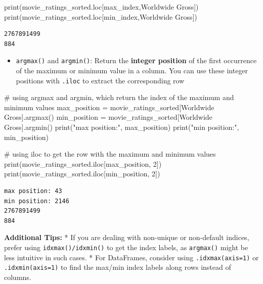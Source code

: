 \documentclass[
  letterpaper,
  DIV=11,
  numbers=noendperiod]{scrreprt}
\newenvironment{Shaded}{\begin{snugshade}}{\end{snugshade}}
\newcommand{\BuiltInTok}[1]{\textcolor[rgb]{0.00,0.23,0.31}{#1}}
\newcommand{\CommentTok}[1]{\textcolor[rgb]{0.37,0.37,0.37}{#1}}
\newcommand{\DecValTok}[1]{\textcolor[rgb]{0.68,0.00,0.00}{#1}}
\newcommand{\NormalTok}[1]{\textcolor[rgb]{0.00,0.23,0.31}{#1}}
\newcommand{\OperatorTok}[1]{\textcolor[rgb]{0.37,0.37,0.37}{#1}}
\newcommand{\StringTok}[1]{\textcolor[rgb]{0.13,0.47,0.30}{#1}}
\providecommand{\tightlist}{%
  \setlength{\itemsep}{0pt}\setlength{\parskip}{0pt}}\usepackage{longtable,booktabs,array}
\begin{document}
\begin{Shaded}
\begin{Highlighting}[]
\BuiltInTok{print}\NormalTok{(movie\_ratings\_sorted.loc[max\_index,}\StringTok{\textquotesingle{}Worldwide Gross\textquotesingle{}}\NormalTok{])}
\BuiltInTok{print}\NormalTok{(movie\_ratings\_sorted.loc[min\_index,}\StringTok{\textquotesingle{}Worldwide Gross\textquotesingle{}}\NormalTok{])}
\end{Highlighting}
\end{Shaded}

\begin{verbatim}
2767891499
884
\end{verbatim}

\begin{itemize}
\tightlist
\item
  \texttt{argmax()} and \texttt{argmin()}: Return the \textbf{integer
  position} of the first occurrence of the maximum or minimum value in a
  column. You can use these integer positions with \texttt{.iloc} to
  extract the corresponding row
\end{itemize}

\begin{Shaded}
\begin{Highlighting}[]
\CommentTok{\# using argmax and argmin, which return the index of the maximum and minimum values}
\NormalTok{max\_position }\OperatorTok{=}\NormalTok{ movie\_ratings\_sorted[}\StringTok{\textquotesingle{}Worldwide Gross\textquotesingle{}}\NormalTok{].argmax()}
\NormalTok{min\_position }\OperatorTok{=}\NormalTok{ movie\_ratings\_sorted[}\StringTok{\textquotesingle{}Worldwide Gross\textquotesingle{}}\NormalTok{].argmin()}
\BuiltInTok{print}\NormalTok{(}\StringTok{"max position:"}\NormalTok{, max\_position)}
\BuiltInTok{print}\NormalTok{(}\StringTok{"min position:"}\NormalTok{, min\_position)}

\CommentTok{\# using iloc to get the row with the maximum and minimum values}
\BuiltInTok{print}\NormalTok{(movie\_ratings\_sorted.iloc[max\_position, }\DecValTok{2}\NormalTok{])}
\BuiltInTok{print}\NormalTok{(movie\_ratings\_sorted.iloc[min\_position, }\DecValTok{2}\NormalTok{])}
\end{Highlighting}
\end{Shaded}

\begin{verbatim}
max position: 43
min position: 2146
2767891499
884
\end{verbatim}

\textbf{Additional Tips:} * If you are dealing with non-unique or
non-default indices, prefer using \texttt{idxmax()/idxmin()} to get the
index labels, as \texttt{argmax()} might be less intuitive in such
cases. * For DataFrames, consider using \texttt{.idxmax(axis=1)} or
\texttt{.idxmin(axis=1)} to find the max/min index labels along rows
instead of columns.
\end{document}
